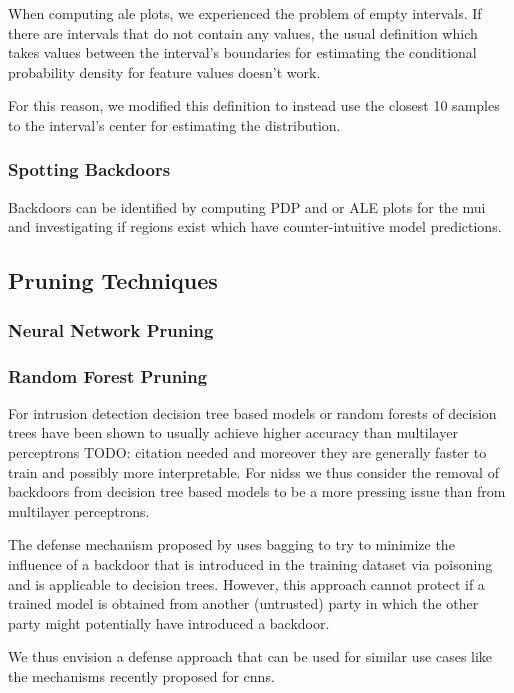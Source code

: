 \documentclass[10pt,sigconf,letterpaper,dvipsnames]{acmart}
\newcommand\note[2]{{\color{#1}#2}}
\newcommand\todo[1]{{\note{red}{TODO: #1}}}
\begin{document}
When computing \gls{ale} plots, we experienced the problem of empty intervals. If there are intervals  that do not contain any values, the usual definition which takes values between the interval's boundaries for estimating the conditional probability density for feature values doesn't work.

For this reason, we modified this definition to instead use the closest 10 samples to the interval's center for estimating the distribution.

\subsubsection{Spotting Backdoors}
Backdoors can be identified by computing PDP and or ALE plots for the \gls{mui} and investigating if regions exist which have counter-intuitive model predictions.
\subsection{Pruning Techniques}
\subsubsection{Neural Network Pruning}
\subsubsection{Random Forest Pruning}
For intrusion detection decision tree based models or random forests of decision trees have been shown to usually achieve higher accuracy than multilayer perceptrons \todo{citation needed} and moreover they are generally faster to train and possibly more interpretable. For \glspl{nids} we thus consider the removal of backdoors from decision tree based models to be a more pressing issue than from multilayer perceptrons. 

The defense mechanism proposed by \cite{biggio_bagging_2011} uses bagging to try to minimize the influence of a backdoor that is introduced in the training dataset via poisoning and is applicable to decision trees. However, this approach cannot protect if a trained model is obtained from another (untrusted) party in which the other party might potentially have introduced a backdoor. 

We thus envision a defense approach that can be used for similar use cases like the mechanisms recently proposed for \glspl{cnn}.
\end{document}
